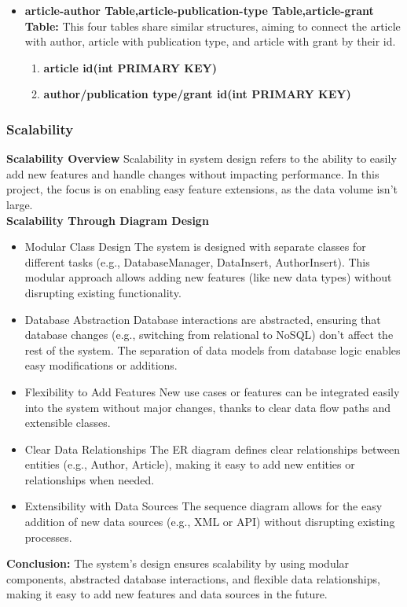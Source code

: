 \documentclass{article}
\begin{document}
\begin{itemize}
\item \textbf{article-author Table,article-publication-type Table,article-grant Table:} This four tables share similar structures, aiming to connect the article with author, article with publication type, and article with grant by their id.
\begin{enumerate}
\item \textbf{article id(int PRIMARY KEY)}
\item \textbf{author/publication type/grant id(int PRIMARY KEY)}
\end{enumerate}


\end{itemize}
\subsubsection{Scalability }

\textbf{Scalability Overview}
Scalability in system design refers to the ability to easily add new features and handle changes without impacting performance. In this project, the focus is on enabling easy feature extensions, as the data volume isn’t large.\\

\textbf{Scalability Through Diagram Design}
\begin{itemize}
\item Modular Class Design
The system is designed with separate classes for different tasks (e.g., DatabaseManager, DataInsert, AuthorInsert). This modular approach allows adding new features (like new data types) without disrupting existing functionality.
\item Database Abstraction
Database interactions are abstracted, ensuring that database changes (e.g., switching from relational to NoSQL) don’t affect the rest of the system. The separation of data models from database logic enables easy modifications or additions.
\item Flexibility to Add Features
New use cases or features can be integrated easily into the system without major changes, thanks to clear data flow paths and extensible classes.
\item Clear Data Relationships
The ER diagram defines clear relationships between entities (e.g., Author, Article), making it easy to add new entities or relationships when needed.
\item Extensibility with Data Sources
The sequence diagram allows for the easy addition of new data sources (e.g., XML or API) without disrupting existing processes.

\end{itemize}
\textbf{Conclusion:}
The system’s design ensures scalability by using modular components, abstracted database interactions, and flexible data relationships, making it easy to add new features and data sources in the future.
\end{document}

